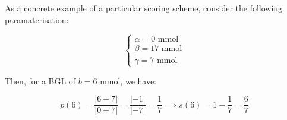 \documentclass[oneside,a4paper]{article}
\theoremstyle{remark}
\begin{document}
        As a concrete example of a particular scoring scheme, consider the following paramaterisation:

        \[
            \begin{cases}
                \alpha=0\text{ mmol}\\
                \beta=17\text{ mmol}\\
                \gamma=7\text{ mmol}
            \end{cases}
        \]


        Then, for a BGL of \(b=6\text{ mmol}\), we have:

        \[
            p\left(6\right)=\frac{|6-7|}{|0-7|}=\frac{|-1|}{|-7|}=\frac{1}{7}\implies s\left(6\right)=1-\frac{1}{7}=\frac{6}{7}
        \]

\end{document}
